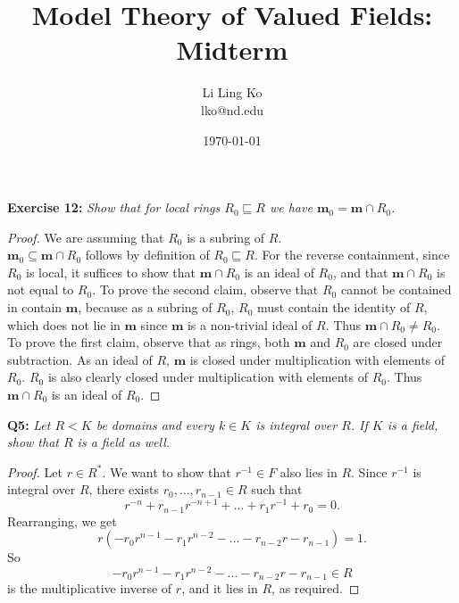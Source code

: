 \documentclass{article}
\begin{document}
\title{Model Theory of Valued Fields: Midterm}
\author{Li Ling Ko\\ lko@nd.edu}
\date{\today}
\maketitle

\textbf{Exercise 12:} \it Show that for local rings $R_0\sqsubseteq R$ we
  have $\bm{m}_0=\bm{m}\cap R_0$.

  \begin{proof}
    We are assuming that $R_0$ is a subring of $R$. \\

    $\bm{m}_0\subseteq\bm{m}\cap R_0$ follows by definition of
    $R_0\sqsubseteq R$. For the reverse containment, since $R_0$ is local,
    it suffices to show that $\bm{m}\cap R_0$ is an ideal of $R_0$, and
    that $\bm{m}\cap R_0$ is not equal to $R_0$. To prove the second
    claim, observe that $R_0$ cannot be contained in contain $\bm{m}$,
    because as a subring of $R_0$, $R_0$ must contain the identity of $R$,
    which does not lie in $\bm{m}$ since $\bm{m}$ is a non-trivial ideal of
    $R$. Thus $\bm{m}\cap R_0\neq R_0$. \\ 

    To prove the first claim, observe that as rings, both $\bm{m}$
    and $R_0$ are closed under subtraction. As an ideal of $R$, $\bm{m}$ is
    closed under multiplication with elements of $R_0$. $R_0$ is also
    clearly closed under multiplication with elements of $R_0$. Thus
    $\bm{m}\cap R_0$ is an ideal of $R_0$.
  \end{proof}

\textbf{Q5:} \it Let $R<K$ be domains and every $k\in K$ is integral over
  $R$. If $K$ is a field, show that $R$ is a field as well.

  \begin{proof}
    Let $r\in R^*$. We want to show that $r^{-1}\in F$ also lies in $R$.
    Since $r^{-1}$ is integral over $R$, there exists
    $r_0,\ldots,r_{n-1}\in R$ such that
    \[r^{-n}+r_{n-1}r^{-n+1} +\ldots +r_1r^{-1}+r_0=0.\]
    Rearranging, we get
    \[r(-r_0r^{n-1} -r_1r^{n-2} -\ldots -r_{n-2}r -r_{n-1}) = 1.\]
    So
    \[-r_0r^{n-1} -r_1r^{n-2} -\ldots -r_{n-2}r -r_{n-1} \in R\]
    is the multiplicative inverse of $r$, and it lies in $R$, as required.
  \end{proof}
\end{document}

